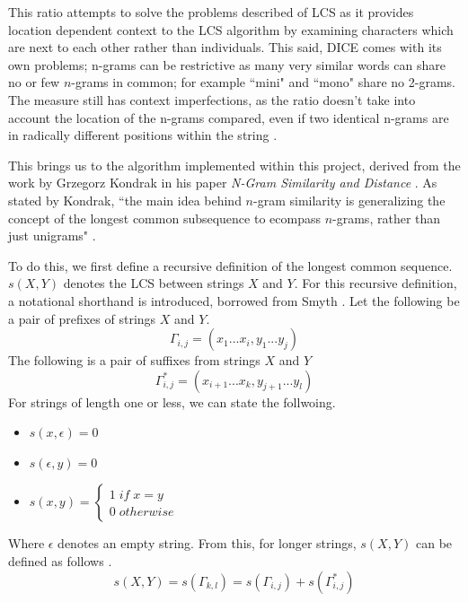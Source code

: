 \documentclass[a4paper,11pt]{article}
\begin{document}
This ratio attempts to solve the problems described of LCS as it provides location dependent context to the LCS algorithm by examining characters which are next to each other rather than individuals. This said, DICE comes with its own problems; n-grams can be restrictive as many very similar words can share no or few $n$-grams in common; for example ``mini" and ``mono" share no 2-grams. The measure still has context imperfections, as the ratio doesn't take into account the location of the n-grams compared, even if two identical n-grams are in radically different positions within the string \citep{ngramDistanceImplementation}.

This brings us to the algorithm implemented within this project, derived from the work by Grzegorz Kondrak in his paper \textit{N-Gram Similarity and Distance }\citep{ngramDistanceImplementation}. As stated by Kondrak, ``the main idea behind $n$-gram similarity is generalizing the concept of the longest common subsequence to ecompass $n$-grams, rather than just unigrams" \citep{ngramDistanceImplementation}.

To do this, we first define a recursive definition of the longest common sequence. $s(X,Y)$ denotes the LCS between strings $X$ and $Y$. For this recursive definition, a notational shorthand is introduced, borrowed from Smyth \citep{computingPatternsInStrings}. Let the following be a pair of prefixes of strings $X$ and $Y$.
\begin{equation}
    \Gamma_{i,j}=(x_1...x_i, y_1...y_j)
\end{equation}
The following is a pair of suffixes from strings $X$ and $Y$
\begin{equation}
    \Gamma_{i,j}^*=(x_{i+1}...x_k, y_{j+1}...y_l)
\end{equation}
For strings of length one or less, we can state the follwoing.
\begin{itemize}
    \item $s(x, \epsilon)=0$
    \item $s(\epsilon,y)=0$
    \item $s(x,y)=\left\{\begin{matrix}
1\; if\; x = y\\ 
0\; otherwise

\end{matrix}\right.$
\end{itemize}

Where $\epsilon$ denotes an empty string.
From this, for longer strings, $s(X,Y)$ can be defined as follows \citep{ngramDistanceImplementation}.
\begin{equation}
    s(X,Y) = s(\Gamma_{k,l})=s(\Gamma_{i,j})+s(\Gamma^*_{i,j})
\end{equation}
\end{document}
